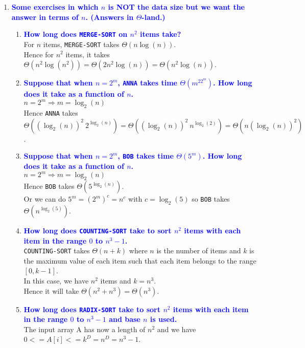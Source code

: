 \documentclass[11pt]{article}
\begin{document}
\begin{enumerate}
\item \textbf{\textcolor{blue}{Some exercises in which $n$ is NOT the data size but we want
the answer in terms of $n$.  (Answers in $\Theta$-land.)}}
    \begin{enumerate}
    \item \textbf{\textcolor{blue}{How long does {\tt MERGE-SORT} on $n^2$ items take?}}
        \\ For $n$ items, {\tt MERGE-SORT} takes $\Theta(n\log(n))$.
        \\ Hence for $n^2$ items, it takes $\Theta(n^2 \log(n^2)) = \Theta(2n^2 \log(n)) = \Theta(n^2 \log(n))$.
    \item \textbf{\textcolor{blue}{Suppose that when $n=2^m$, {\tt ANNA} takes time $\Theta(m^22^m)$.
    How long does it take as a function of $n$.}}
        \\ $n=2^m \Rightarrow m=\log_2(n)$
        \\ Hence {\tt ANNA} takes $\Theta((\log_2(n))^2\ 2^{\log_2(n)}) = \Theta((\log_2(n))^2\ n^{\log_2(2)}) = \Theta(n(\log_2(n))^2)$.
    \item \textbf{\textcolor{blue}{Suppose that when $n=2^m$, {\tt BOB} takes time $\Theta(5^m)$.
    How long does it take as a function of $n$.}}
        \\ $n=2^m \Rightarrow m=\log_2(n)$
        \\ Hence {\tt BOB} takes $\Theta(5^{\log_2(n)})$.
        \\ Or we can do $5^m = (2^{m})^c = n^c$ with $c = \log_2(5)$ so {\tt BOB} takes $\Theta(n^{\log_2(5)})$.
    \item \textbf{\textcolor{blue}{How long does {\tt COUNTING-SORT} take to sort $n^2$ items with
    each item in the range $0$ to $n^3-1$.}}
        \\ {\tt COUNTING-SORT} takes $\Theta(n+k)$ where $n$ is the number of items and $k$ is the maximum value of each item such that each item belongs to the range $[0, k-1]$.
        \\ In this case, we have $n^2$ items and $k = n^3$.
        \\ Hence it will take $\Theta(n^2 + n^3) = \Theta(n^3)$.
    \item \textbf{\textcolor{blue}{How long does {\tt RADIX-SORT} take to sort $n^2$ items with
    each item in the range $0$ to $n^3-1$ and base $n$ is used.}}
        \\ The input array A has now a length of $n^2$ and we have $0 <= A[i] <= k^D = n^D = n^3 - 1$.

\end{enumerate}
\end{enumerate}
\end{document}
